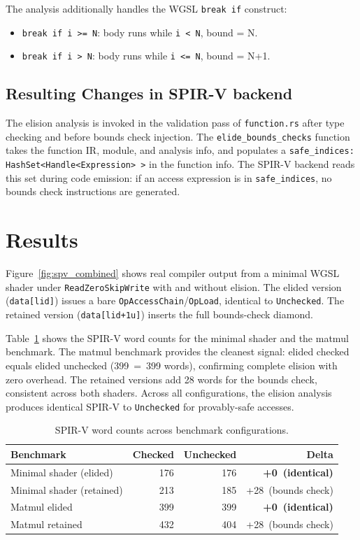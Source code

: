 \documentclass[11pt,a4paper]{article}
\begin{document}
The analysis additionally handles the WGSL \texttt{break if} construct:
\begin{itemize}
  \item \texttt{break if i >= N}: body runs while \texttt{i < N}, bound = N.
  \item \texttt{break if i > N}: body runs while \texttt{i <= N}, bound = N+1.
\end{itemize}

\subsection{Resulting Changes  in SPIR-V backend}

The elision analysis is invoked in the validation pass of
\texttt{function.rs} after type checking and before bounds check injection.
The \texttt{elide\_bounds\_checks} function takes the function IR, module,
and analysis info, and populates a
\texttt{safe\_indices: HashSet<Handle<Expression>\,>} in the function info. The
SPIR-V backend reads this set during code emission: if an access expression
is in \texttt{safe\_indices}, no bounds check instructions are generated.

\section{Results}
\label{sec:results}

Figure~\ref{fig:spv_combined} shows real compiler
output from a minimal WGSL shader under \texttt{ReadZeroSkipWrite} with and
without elision. The elided version (\texttt{data[lid]}) issues a bare
\texttt{OpAccessChain}/\texttt{OpLoad}, identical to \texttt{Unchecked}. The
retained version (\texttt{data[lid+1u]}) inserts the full bounds-check
diamond.

Table~\ref{tab:words} shows the SPIR-V word counts for the minimal shader
and the matmul benchmark. The matmul benchmark provides the cleanest signal:
elided checked equals elided unchecked (399~=~399 words), confirming complete
elision with zero overhead. The retained versions add 28 words for the bounds
check, consistent across both shaders. Across all configurations, the elision
analysis produces identical SPIR-V to \texttt{Unchecked} for provably-safe
accesses.

\begin{table}[htbp]
\centering
\caption{SPIR-V word counts across benchmark configurations.}
\label{tab:words}
\small
\begin{tabular}{lrrr}
\toprule
Benchmark & Checked & Unchecked & Delta \\
\midrule
Minimal shader (elided)   & 176 & 176 & \textbf{+0~(identical)} \\
Minimal shader (retained) & 213 & 185 & +28~(bounds check) \\
Matmul elided             & 399 & 399 & \textbf{+0~(identical)} \\
Matmul retained           & 432 & 404 & +28~(bounds check) \\
\bottomrule
\end{tabular}
\end{table}
\end{document}
